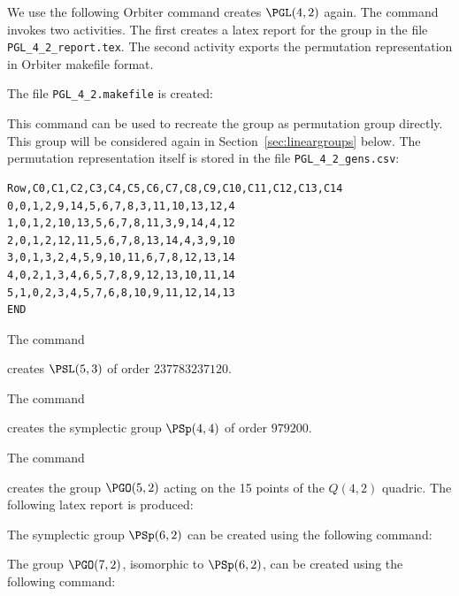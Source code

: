 \bigskip




We use the following Orbiter command creates $\PGL(4,2)$ again.
The command invokes two activities. 
The first creates a latex report for the group in the file \verb'PGL_4_2_report.tex'.
The second activity exports the permutation representation in Orbiter makefile format.
{\tt

}
The file \verb'PGL_4_2.makefile' is created:
{\tt

}
This command can be used to recreate the group as permutation group directly.
This group will be considered again in Section~\ref{sec:lineargroups} below.
The permutation representation itself is stored in the file \verb'PGL_4_2_gens.csv':
\begin{verbatim}
Row,C0,C1,C2,C3,C4,C5,C6,C7,C8,C9,C10,C11,C12,C13,C14
0,0,1,2,9,14,5,6,7,8,3,11,10,13,12,4
1,0,1,2,10,13,5,6,7,8,11,3,9,14,4,12
2,0,1,2,12,11,5,6,7,8,13,14,4,3,9,10
3,0,1,3,2,4,5,9,10,11,6,7,8,12,13,14
4,0,2,1,3,4,6,5,7,8,9,12,13,10,11,14
5,1,0,2,3,4,5,7,6,8,10,9,11,12,14,13
END
\end{verbatim}

\bigskip



The command
{\tt

}
creates $\PSL(5,3)$ of order $237783237120.$

\bigskip


The command 
{\tt

}
creates the symplectic group $\PSp(4,4)$ of order $979200.$


\bigskip



The command 
{\tt

}
creates the group $\PGO(5,2)$ acting on the 15 points of the $Q(4,2)$ quadric. 
The following latex report is produced:
\begin{mdframed}[style=MyFrame]

\end{mdframed}


\bigskip


The symplectic group $\PSp(6,2)$  can be created using the following command: 
{\tt

}

\bigskip

The group $\PGO(7,2)$, isomorphic to  $\PSp(6,2)$, can be created using the following command: 
{\tt

}


